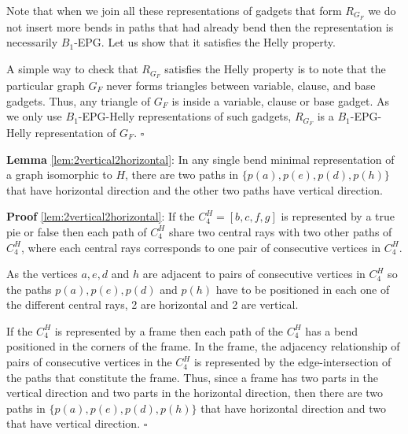 \documentclass[9pt]{entcs}
\begin{document}
\begin{prove*}






Note that when we join all these representations of gadgets that form $ R_{G_F} $ we do not insert more bends in paths that had already bend then the representation is necessarily  $ B_1$-EPG. Let us show that it satisfies the Helly property. 

A simple way to check that $ R_{G_F} $ satisfies the Helly property  is to note that the particular graph $G_F$ never forms triangles between variable, clause, and base gadgets. Thus, any triangle of $G_F$ is inside a variable, clause or base gadget. As we only use $B_1$-EPG-Helly representations of such gadgets, $ R_{G_F} $ is a $B_1$-EPG-Helly representation of $G_F$.
$\square$ \end{prove*}

\begin{lema*}\textbf{Lemma} \ref{lem:2vertical2horizontal}:
In any single bend minimal representation of a graph isomorphic to $H$, there are two paths in $\{p(a), p(e), p(d), p(h) \}$ that have horizontal direction and the other two paths have vertical direction.
\end{lema*}

\begin{prove*}\textbf{Proof} \ref{lem:2vertical2horizontal}:
If the $C_4^{H} = [b,c,f,g]$ is  represented by a true pie or false then each path of $C_4^{H}$ share two central rays with two other paths of $C_4^{H}$, where each central rays corresponds to one pair of consecutive vertices in $C_4^{H}$.

As the vertices $a, e, d $ and $ h$ are adjacent to pairs of consecutive vertices in $C_4^{H}$ so the paths $p(a), p(e), p(d)$ and $p(h)$ have to be positioned in each one of the different central rays,  2 are horizontal  and 2 are vertical.

If the $C_4^{H}$ is  represented by a frame then each path of the $C_4^{H}$ has a bend positioned in  the corners of the frame. In the frame, the adjacency relationship of pairs of consecutive vertices in the $C_4^{H}$ is represented by the edge-intersection of the paths that constitute the frame. Thus, since a frame has two parts in the vertical direction and two parts in the horizontal direction, then there are two paths in $\{p(a), p(e), p(d), p(h)\}$ that have horizontal direction and two that have vertical direction.
$\square$ \end{prove*}
\end{document}
